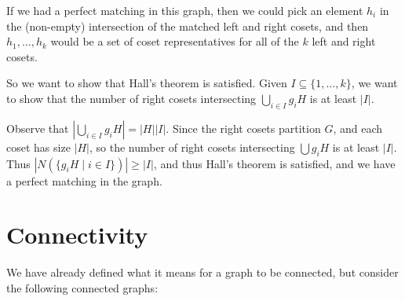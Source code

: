 \documentclass[a4paper]{scrartcl}
\begin{document}
\begin{example}
\begin{center}

\end{center}

If we had a perfect matching in this graph, then we could pick an element $h_i$ in the (non-empty) intersection of the matched left and right cosets, and then $h_1, \dots, h_k$ would be a set of coset representatives for all of the $k$ left and right cosets.

So we want to show that Hall's theorem is satisfied.
Given $I \subseteq \{1, \dots, k\}$, we want to show that the number of right cosets intersecting $\bigcup_{i \in I} g_i H$ is at least $|I|$.

Observe that $\left|\bigcup_{i \in I} g_i H\right| = |H| |I|$. Since the right cosets partition $G$, and each coset has size $|H|$, so the number of right cosets intersecting $\bigcup g_i H$ is at least $|I|$. Thus $|N(\{g_iH \mid i \in I\})| \geq |I|$, and thus Hall's theorem is satisfied, and we have a perfect matching in the graph.

\end{example}

\section{Connectivity}

We have already defined what it means for a graph to be connected, but consider the following connected graphs:
\end{document}
